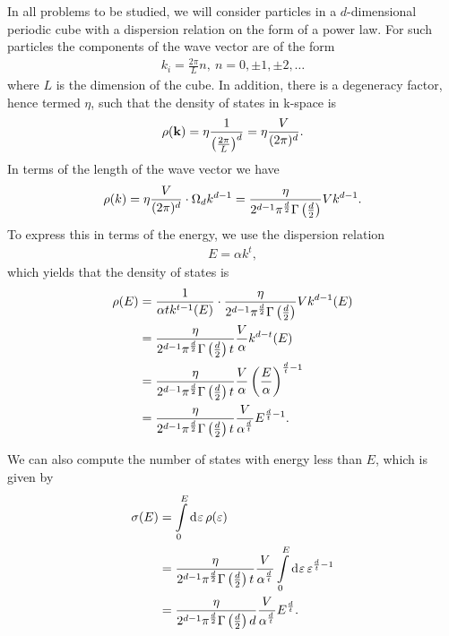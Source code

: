 In all problems to be studied, we will consider particles in a $d$-dimensional periodic cube with a dispersion relation on the form of a power law. For such particles the components of the wave vector are of the form
\begin{align*}
	k_{i} = \frac{2\pi}{L}n,\ n = 0, \pm 1, \pm 2, \dots
\end{align*}
where $L$ is the dimension of the cube. In addition, there is a degeneracy factor, hence termed $\eta$, such that the density of states in k-space is
\begin{align*}
	\rho(\vb{k}) = \eta\frac{1}{\left(\frac{2\pi}{L}\right)^{d}} = \eta\frac{V}{(2\pi)^{d}}.
\end{align*}
In terms of the length of the wave vector we have
\begin{align*}
	\rho(k) = \eta\frac{V}{(2\pi)^{d}}\cdot \Omega_{d}k^{d - 1} = \frac{\eta}{2^{d - 1}\pi^{\frac{d}{2}}\Gamma\left(\frac{d}{2}\right)}Vk^{d - 1}.
\end{align*}
To express this in terms of the energy, we use the dispersion relation
\begin{align*}
	E = \alpha k^{t},
\end{align*}
which yields that the density of states is
\begin{align*}
	\rho(E) &= \frac{1}{\alpha tk^{t - 1}(E)}\cdot \frac{\eta}{2^{d - 1}\pi^{\frac{d}{2}}\Gamma\left(\frac{d}{2}\right)}Vk^{d - 1}(E) \\
	        &= \frac{\eta}{2^{d - 1}\pi^{\frac{d}{2}}\Gamma\left(\frac{d}{2}\right)t}\frac{V}{\alpha}k^{d - t}(E) \\
	        &= \frac{\eta}{2^{d - 1}\pi^{\frac{d}{2}}\Gamma\left(\frac{d}{2}\right)t}\frac{V}{\alpha}\left(\frac{E}{\alpha}\right)^{\frac{d}{t} - 1} \\
	        &= \frac{\eta}{2^{d - 1}\pi^{\frac{d}{2}}\Gamma\left(\frac{d}{2}\right)t}\frac{V}{\alpha^{\frac{d}{t}}}E^{\frac{d}{t} - 1}.
\end{align*}

We can also compute the number of states with energy less than $E$, which is given by
\begin{align*}
	\sigma(E) &= \int\limits_{0}^{E}\dd[]{\varepsilon}\rho(\varepsilon) \\
              &= \frac{\eta}{2^{d - 1}\pi^{\frac{d}{2}}\Gamma\left(\frac{d}{2}\right)t}\frac{V}{\alpha^{\frac{d}{t}}}\int\limits_{0}^{E}\dd[]{\varepsilon}\varepsilon^{\frac{d}{t} - 1} \\
              &= \frac{\eta}{2^{d - 1}\pi^{\frac{d}{2}}\Gamma\left(\frac{d}{2}\right)d}\frac{V}{\alpha^{\frac{d}{t}}}E^{\frac{d}{t}}.
\end{align*}

